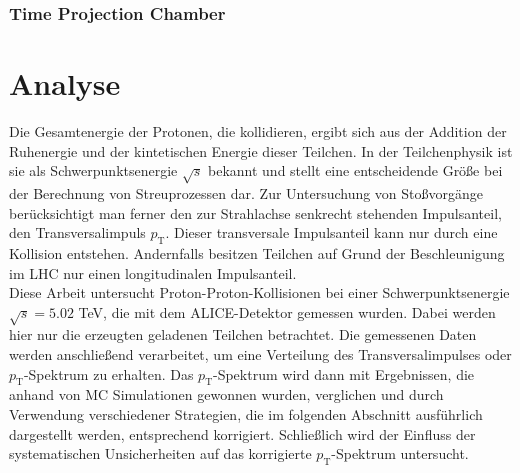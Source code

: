 \documentclass[12pt,a4paper]{report}
\begin{document}
\subsection{Time Projection Chamber}

\chapter{Analyse}
\label{chap:Analyse}
Die Gesamtenergie der Protonen, die kollidieren, ergibt sich aus der Addition der Ruhenergie und der kintetischen Energie dieser Teilchen. In der Teilchenphysik ist sie als Schwerpunktsenergie $\sqrt{s}$ bekannt und stellt eine entscheidende Größe bei der Berechnung von Streuprozessen dar. Zur Untersuchung von Stoßvorgänge berücksichtigt man ferner den zur Strahlachse senkrecht stehenden Impulsanteil, den Transversalimpuls $p_{\mathrm{T}}$. Dieser transversale Impulsanteil kann nur durch eine Kollision entstehen. Andernfalls besitzen Teilchen auf Grund der Beschleunigung im LHC nur einen longitudinalen Impulsanteil. \\
Diese Arbeit untersucht Proton-Proton-Kollisionen bei einer Schwerpunktsenergie $\sqrt{s} = 5.02$ TeV, die mit dem ALICE-Detektor gemessen wurden. Dabei werden hier nur die erzeugten geladenen Teilchen betrachtet. Die gemessenen Daten werden anschließend verarbeitet, um eine Verteilung des Transversalimpulses oder $p_{\mathrm{T}}$-Spektrum zu erhalten. Das $p_{\mathrm{T}}$-Spektrum wird dann mit Ergebnissen, die anhand von MC Simulationen gewonnen wurden, verglichen und durch Verwendung verschiedener Strategien, die im folgenden Abschnitt ausführlich dargestellt werden, entsprechend korrigiert. Schließlich wird der Einfluss der systematischen Unsicherheiten auf das korrigierte $p_{\mathrm{T}}$-Spektrum untersucht.
\end{document}
